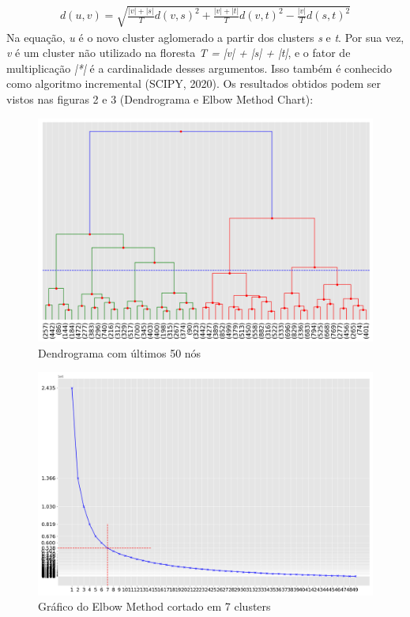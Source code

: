 \documentclass[twocolumn]{rbef}
\newcommand{\1}{\mathbbm{1}}
\begin{document}
\begin{align*}
d(u, v) = \sqrt{\frac{|v| + |s|}{T} d(v, s)^2 + \frac{|v| + |t|}{T} d(v, t)^2 - \frac{|v|}{T} d(s, t)^2}
\end{align*}
Na equação, \emph{u} é o novo cluster aglomerado a partir dos clusters \emph{s} e \emph{t}. Por sua vez, \emph{v} é um cluster não utilizado na floresta \emph{T = |v| + |s| + |t|}, e o fator de multiplicação \emph{|*|} é a cardinalidade desses argumentos. Isso também é conhecido como algoritmo incremental (SCIPY, 2020)\cite{SCIPY}.
\newline\linebreak Os resultados obtidos podem ser vistos nas figuras 2 e 3 (Dendrograma e Elbow Method Chart):
\begin{figure}[!htb]
  \includegraphics[scale=0.22]{2. Dendrograma Clientes 7 clusteres.png}
  \caption{Dendrograma com últimos 50 nós}
  \label{fig2}
\end{figure}
\begin{figure}[!htb]
  \includegraphics[scale=0.22]{3. Elbow - Clientes 7 clusteres.png}
  \caption{Gráfico do Elbow Method cortado em 7 clusters}
  \label{fig3}
\end{figure}
\end{document}
